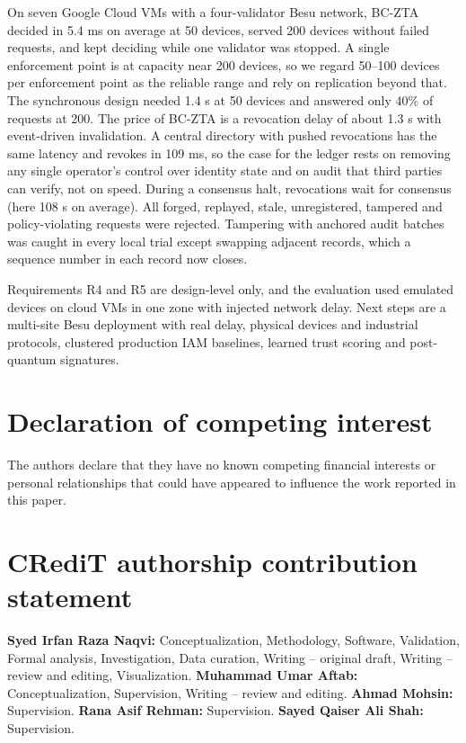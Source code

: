 \documentclass[a4paper,5p,times,twocolumn,number,sort&compress]{elsarticle}
\begin{document}
On seven Google Cloud VMs with a four-validator Besu network, BC-ZTA decided in 5.4 ms on average at 50 devices, served 200 devices without failed requests, and kept deciding while one validator was stopped. A single enforcement point is at capacity near 200 devices, so we regard 50--100 devices per enforcement point as the reliable range and rely on replication beyond that. The synchronous design needed 1.4 s at 50 devices and answered only 40\% of requests at 200. The price of BC-ZTA is a revocation delay of about 1.3 s with event-driven invalidation. A central directory with pushed revocations has the same latency and revokes in 109 ms, so the case for the ledger rests on removing any single operator's control over identity state and on audit that third parties can verify, not on speed. During a consensus halt, revocations wait for consensus (here 108 s on average). All forged, replayed, stale, unregistered, tampered and policy-violating requests were rejected. Tampering with anchored audit batches was caught in every local trial except swapping adjacent records, which a sequence number in each record now closes.

Requirements R4 and R5 are design-level only, and the evaluation used emulated devices on cloud VMs in one zone with injected network delay. Next steps are a multi-site Besu deployment with real delay, physical devices and industrial protocols, clustered production IAM baselines, learned trust scoring and post-quantum signatures.

\section*{Declaration of competing interest}

The authors declare that they have no known competing financial interests or personal relationships that could have appeared to influence the work reported in this paper.

\section*{CRediT authorship contribution statement}

\textbf{Syed Irfan Raza Naqvi:} Conceptualization, Methodology, Software, Validation, Formal analysis, Investigation, Data curation, Writing -- original draft, Writing -- review and editing, Visualization. \textbf{Muhammad Umar Aftab:} Conceptualization, Supervision, Writing -- review and editing. \textbf{Ahmad Mohsin:} Supervision. \textbf{Rana Asif Rehman:} Supervision. \textbf{Sayed Qaiser Ali Shah:} Supervision.
\end{document}
